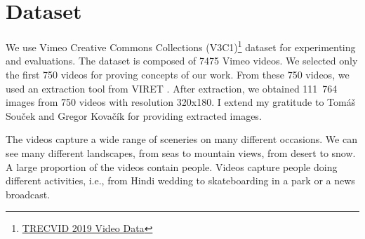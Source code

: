 \section{Dataset}
\label{s:dataset}

We use Vimeo Creative Commons Collections (V3C1)\footnote{\href{https://www-nlpir.nist.gov/projects/tv2019/data.html}{TRECVID 2019 Video Data}} dataset for experimenting and evaluations. The dataset is composed of 7475 Vimeo videos. We selected only the first 750 videos for proving concepts of our work. From these 750 videos, we used an extraction tool from VIRET \cite{lokovc2019framework}. After extraction, we obtained 111\ 764 images from 750 videos with resolution 320x180. I extend my gratitude to Tomáš Souček and Gregor Kovačík for providing extracted images.

The videos capture a wide range of sceneries on many different occasions. We can see many different landscapes, from seas to mountain views, from desert to snow. A large proportion of the videos contain people. Videos capture people doing different activities, i.e., from Hindi wedding to skateboarding in a park or a news broadcast.